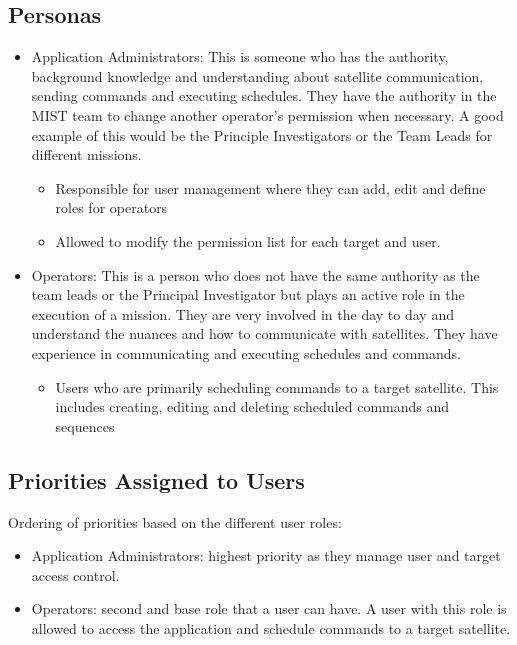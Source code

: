 \documentclass[12pt]{article}
\begin{document}
\subsection{Personas}
\begin{itemize}
    \item Application Administrators: This is someone who has the authority, background knowledge and understanding about satellite communication, sending commands and executing schedules. They have the authority in the MIST team to change another operator's permission when necessary. A good example of this would be the Principle Investigators or the Team Leads for different missions.  
    \begin{itemize}
        \item Responsible for user management where they can add, edit and define roles for operators
        \item Allowed to modify the permission list for each target and user.
    \end{itemize}

    \item Operators: This is a person who does not have the same authority as the team leads or the Principal Investigator but plays an active role in the execution of a mission. They are very involved in the day to day and understand the nuances and how to communicate with satellites. They have experience in communicating and executing schedules and commands. 
    \begin{itemize}
        \item Users who are primarily scheduling commands to a target satellite. This includes creating, editing and deleting scheduled commands and sequences
    \end{itemize}
\end{itemize}
\subsection{Priorities Assigned to Users}
Ordering of priorities based on the different user roles:
\begin{itemize}
    \item Application Administrators: highest priority as they manage user and target access control.
    \item Operators: second and base role that a user can have. A user with this role is allowed to access the application and schedule commands to a target satellite.

\end{itemize}
\end{document}
